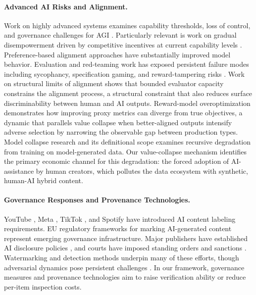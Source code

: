 \documentclass{article}
\theoremstyle{plain}
\theoremstyle{definition}
\theoremstyle{remark}
\begin{document}
\paragraph{Advanced AI Risks and Alignment.}
Work on highly advanced systems examines capability thresholds, loss of control, and governance challenges for AGI \citep{hendrycks2025definitionagi, Bostrom2014-BOSS, russell2019human}. Particularly relevant is work on gradual disempowerment driven by competitive incentives at current capability levels \citep{kulveit2025gradualdisempowermentsystemicexistential}. Preference-based alignment approaches \citep{ziegler2020finetuninglanguagemodelshuman, NEURIPS2022_b1efde53, bai2022traininghelpfulharmlessassistant, bai2022constitutionalaiharmlessnessai} have substantially improved model behavior. Evaluation and red-teaming work has exposed persistent failure modes including sycophancy, specification gaming, and reward-tampering risks \citep{perez-etal-2023-discovering, denison2024sycophancysubterfugeinvestigatingrewardtampering, sharma2024towards}. Work on structural limits of alignment \citep{cao2025alignmentbottleneck} shows that bounded evaluator capacity constrains the alignment process, a structural constraint that also reduces surface discriminability between human and AI outputs. Reward-model overoptimization \citep{gao2023scaling} demonstrates how improving proxy metrics can diverge from true objectives, a dynamic that parallels value collapse when better-aligned outputs intensify adverse selection by narrowing the observable gap between production types. Model collapse research \citep{shumailov2024curserecursiontraininggenerated, alemohammad2024selfconsuming} and its definitional scope \citep{schaeffer2025positionmodelcollapsedoes} examines recursive degradation from training on model-generated data. Our value-collapse mechanism identifies the primary economic channel for this degradation: the forced adoption of AI-assistance by human creators, which pollutes the data ecosystem with synthetic, human-AI hybrid content.

\paragraph{Governance Responses and Provenance Technologies.}
YouTube \citep{youtube2024disclose}, Meta \citep{meta2025labeling}, TikTok \citep{tiktok2024transparency}, and Spotify \citep{spotify2025protections} have introduced AI content labeling requirements. EU regulatory frameworks for marking AI-generated content \citep{eu2025codepractice} represent emerging governance infrastructure. Major publishers have established AI disclosure policies \citep{gewaltig-2025-ai, zhu-2025-generative}, and courts have imposed standing orders and sanctions \citep{mata2023sanctions, baylson2023aiorder}. Watermarking \citep{pmlr-v202-kirchenbauer23a, zhao2024provable} and detection methods underpin many of these efforts, though adversarial dynamics pose persistent challenges \citep{sadasivan2025aigeneratedtextreliablydetected}. In our framework, governance measures and provenance technologies aim to raise verification ability or reduce per-item inspection costs. 
\end{document}
